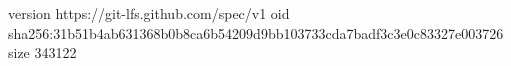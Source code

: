 version https://git-lfs.github.com/spec/v1
oid sha256:31b51b4ab631368b0b8ca6b54209d9bb103733cda7badf3c3e0c83327e003726
size 343122
